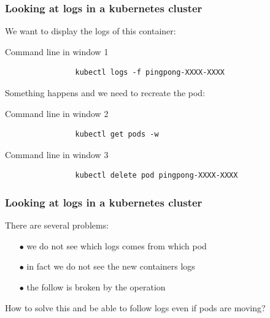 	\begin{frame}[fragile]
		\frametitle{Looking at logs in a kubernetes cluster}
	
		We want to display the logs of this container:
		\begin{block}{Command line in window 1}
			\begin{verbatim}
				kubectl logs -f pingpong-XXXX-XXXX
			\end{verbatim}
		\end{block}
		
		Something happens and we need to recreate the pod:
		\begin{block}{Command line in window 2}
			\begin{verbatim}
				kubectl get pods -w
			\end{verbatim}
		\end{block}
		\begin{block}{Command line in window 3}
			\begin{verbatim}
				kubectl delete pod pingpong-XXXX-XXXX
			\end{verbatim}
		\end{block}
	\end{frame}
	
	\begin{frame}[fragile]
		\frametitle{Looking at logs in a kubernetes cluster}
	
		There are several problems:
		\begin{itemize}
			\item[$\bullet$] we do not see which logs comes from which pod
			\item[$\bullet$] in fact we do not see the new containers logs
			\item[$\bullet$] the follow is broken by the operation
		\end{itemize}
		
		How to solve this and be able to follow logs even if pods are moving?
	\end{frame}

